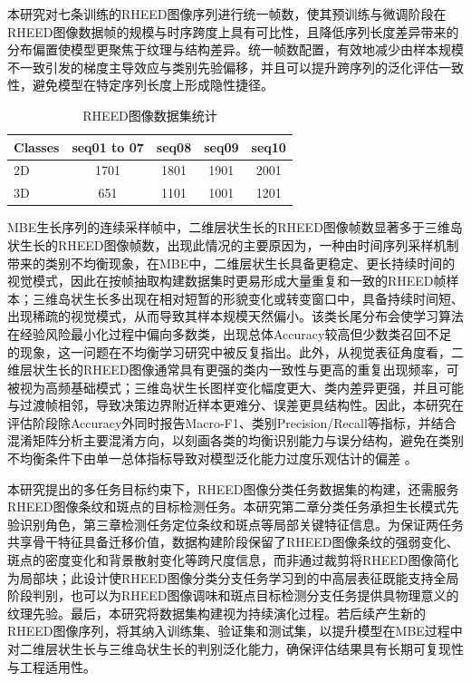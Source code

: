 本研究对七条训练的RHEED图像序列进行统一帧数，使其预训练与微调阶段在RHEED图像数据帧的规模与时序跨度上具有可比性，且降低序列长度差异带来的分布偏置使模型更聚焦于纹理与结构差异。统一帧数配置，有效地减少由样本规模不一致引发的梯度主导效应与类别先验偏移，并且可以提升跨序列的泛化评估一致性，避免模型在特定序列长度上形成隐性捷径。

\begin{table}[h]
    \centering
    \caption{RHEED图像数据集统计}
    \label{tab:cp2_dataset_after_trim}
    \begin{tabular}{lcccc}
        \hline
        \textbf{Classes} & \textbf{seq01 to 07} & \textbf{seq08} & \textbf{seq09} & \textbf{seq10} \\ \hline
        2D               & 1701                 & 1801           & 1901           & 2001           \\
        3D               & 651                  & 1101           & 1001           & 1201           \\ \hline
    \end{tabular}
\end{table}

MBE生长序列的连续采样帧中，二维层状生长的RHEED图像帧数显著多于三维岛状生长的RHEED图像帧数，出现此情况的主要原因为，一种由时间序列采样机制带来的类别不均衡现象，在MBE中，二维层状生长具备更稳定、更长持续时间的视觉模式，因此在按帧抽取构建数据集时更易形成大量重复和一致的RHEED帧样本；三维岛状生长多出现在相对短暂的形貌变化或转变窗口中，具备持续时间短、出现稀疏的视觉模式，从而导致其样本规模天然偏小。该类长尾分布会使学习算法在经验风险最小化过程中偏向多数类，出现总体Accuracy较高但少数类召回不足的现象，这一问题在不均衡学习研究中被反复指出。此外，从视觉表征角度看，二维层状生长的RHEED图像通常具有更强的类内一致性与更高的重复出现频率，可被视为高频基础模式；三维岛状生长图样变化幅度更大、类内差异更强，并且可能与过渡帧相邻，导致决策边界附近样本更难分、误差更具结构性。因此，本研究在评估阶段除Accuracy外同时报告Macro-F1、类别Precision/Recall等指标，并结合混淆矩阵分析主要混淆方向，以刻画各类的均衡识别能力与误分结构，避免在类别不均衡条件下由单一总体指标导致对模型泛化能力过度乐观估计的偏差 \cite{Kautz2017PR}。

本研究提出的多任务目标约束下，RHEED图像分类任务数据集的构建，还需服务RHEED图像条纹和斑点的目标检测任务。本研究第二章分类任务承担生长模式先验识别角色，第三章检测任务定位条纹和斑点等局部关键特征信息。为保证两任务共享骨干特征具备迁移价值，数据构建阶段保留了RHEED图像条纹的强弱变化、斑点的密度变化和背景散射变化等跨尺度信息，而非通过裁剪将RHEED图像简化为局部块；此设计使RHEED图像分类分支任务学习到的中高层表征既能支持全局阶段判别，也可以为RHEED图像调味和斑点目标检测分支任务提供具物理意义的纹理先验。最后，本研究将数据集构建视为持续演化过程。若后续产生新的RHEED图像序列，将其纳入训练集、验证集和测试集，以提升模型在MBE过程中对二维层状生长与三维岛状生长的判别泛化能力，确保评估结果具有长期可复现性与工程适用性。

